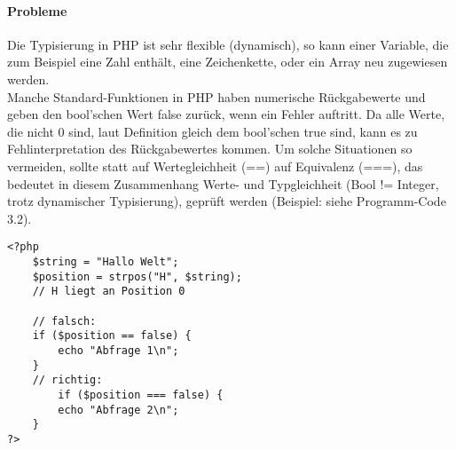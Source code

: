 \paragraph{Probleme} 
Die Typisierung in PHP ist sehr flexible (dynamisch), so kann einer Variable, die zum Beispiel eine Zahl enthält, eine Zeichenkette, oder ein Array neu zugewiesen werden.\\
Manche Standard-Funktionen in PHP haben numerische Rückgabewerte und geben den bool'schen Wert false zurück, wenn ein Fehler auftritt. Da alle Werte, die nicht 0 sind, laut Definition gleich dem bool'schen true sind, kann es zu Fehlinterpretation des Rückgabewertes kommen. Um solche Situationen so vermeiden, sollte statt auf Wertegleichheit (==) auf Equivalenz (===), das bedeutet in diesem Zusammenhang Werte- und Typgleichheit (Bool != Integer, trotz dynamischer Typisierung), geprüft werden (Beispiel: siehe Programm-Code 3.2).
\begin{lstlisting}[style=customPHP, caption={false}]
<?php 
	$string = "Hallo Welt";
	$position = strpos("H", $string); 
	// H liegt an Position 0
	
	// falsch:
	if ($position == false) {
		echo "Abfrage 1\n";
	}
	// richtig:
		if ($position === false) {
		echo "Abfrage 2\n";
	}
?>
\end{lstlisting}